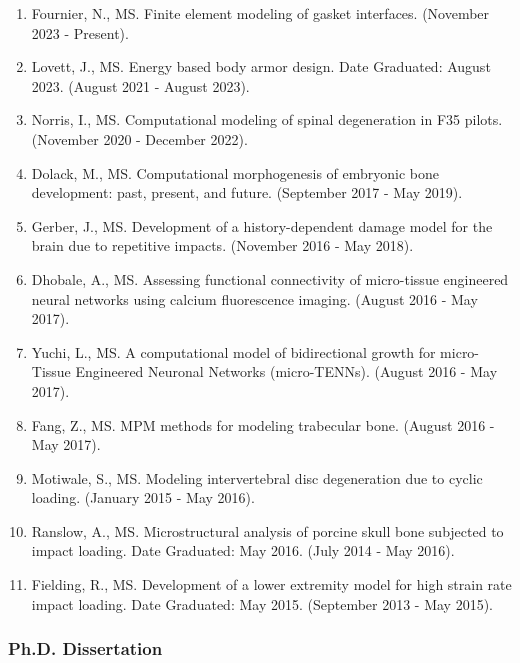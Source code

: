 \documentclass[
]{article}
\begin{document}
\begin{enumerate}
\def\labelenumi{\arabic{enumi}.}
\item Fournier, N.,
 MS. Finite element modeling of gasket interfaces. (November 2023 - Present).
\item Lovett, J.,
 MS. Energy based body armor design. Date Graduated: August 2023. (August 2021 - August 2023).
\item Norris, I., 
MS. Computational modeling of spinal degeneration in F35 pilots. (November 2020 - December 2022).
\item Dolack, M.,
 MS. Computational morphogenesis of embryonic bone development: past, present, and future. (September 2017 - May 2019).
\item Gerber, J., 
MS. Development of a history-dependent damage model for the brain due to repetitive impacts. (November 2016 - May 2018).
\item Dhobale, A.,
 MS. Assessing functional connectivity of micro-tissue engineered neural networks using calcium fluorescence imaging. (August 2016 - May 2017).
\item Yuchi, L.,
 MS. A computational model of bidirectional growth for micro-Tissue Engineered Neuronal Networks (micro-TENNs). (August 2016 - May 2017).
\item Fang, Z.,
 MS. MPM methods for modeling trabecular bone. (August 2016 - May 2017).
\item Motiwale, S.,
 MS. Modeling intervertebral disc degeneration due to cyclic loading. (January 2015 - May 2016).
\item Ranslow, A.,
 MS. Microstructural analysis of porcine skull bone subjected to impact loading. Date Graduated: May 2016. (July 2014 - May 2016).
\item Fielding, R.,
 MS. Development of a lower extremity model for high strain rate impact loading. Date Graduated: May 2015. (September 2013 - May 2015).
\end{enumerate}

\subsubsection{Ph.D. Dissertation}\label{ph.d.-dissertation}
\end{document}
